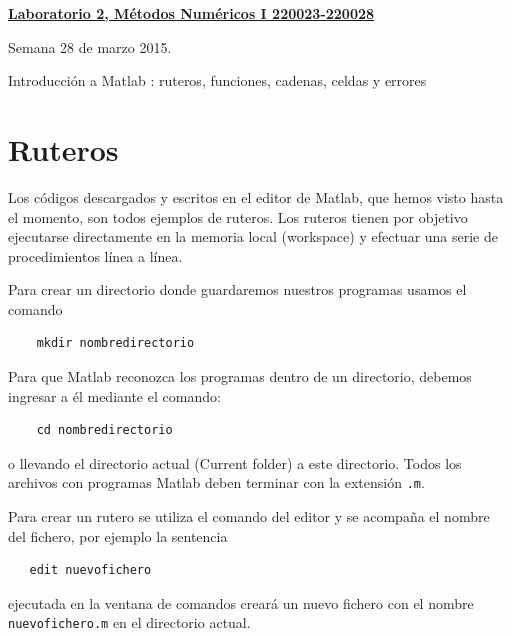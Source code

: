 \documentclass[11pt]{article}
\begin{document}
\hspace*{-1,5cm}

\vspace*{0.5cm} \centerline {\bf\underline{Laboratorio 2, M\'etodos Num\'ericos I 220023-220028 }}
\centerline{\textrm{Semana 28 de marzo 2015.}}  \vspace{0.2cm}

\centerline{Introducci\'on  a Matlab \circledR:  ruteros, funciones, cadenas, celdas y errores} 
%


\section{Ruteros}
  Los c\'odigos descargados y escritos en el editor de Matlab, que hemos visto hasta el momento,  son todos ejemplos de ruteros. Los ruteros tienen por objetivo ejecutarse directamente en la memoria local (workspace) y efectuar una serie de procedimientos l\'inea a l\'inea.
  
Para crear un directorio donde guardaremos nuestros programas usamos el comando
\begin{verbatim}
	mkdir nombredirectorio
\end{verbatim}
Para que Matlab reconozca los programas dentro de un directorio, debemos ingresar a \'el mediante el comando:
\begin{verbatim}
	cd nombredirectorio
\end{verbatim}
o llevando el directorio actual (Current folder) a este directorio. Todos los archivos con programas Matlab deben terminar con la extensi\'on \texttt{.m}. 
  
Para crear un rutero se utiliza el comando del editor y se acompaña el nombre del fichero, por ejemplo la sentencia 
  \begin{verbatim}
   edit nuevofichero
  \end{verbatim}
ejecutada en la ventana de comandos crear\'a un nuevo fichero con el nombre \texttt{nuevofichero.m} en el directorio actual.
\end{document}
